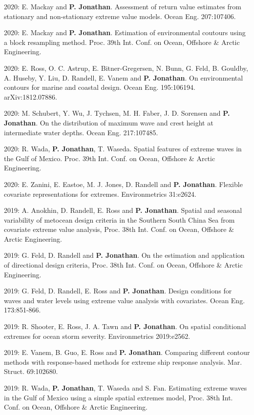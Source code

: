 \documentclass[11pt,a4paper]{moderncv}
\begin{document}
2020: E. Mackay and \textbf{P. Jonathan}. Assessment of return value estimates from stationary and non-stationary extreme value models. Ocean Eng. 207:107406.

2020: E. Mackay and \textbf{P. Jonathan}. Estimation of environmental coutours using a block resampling method. Proc. 39th Int. Conf. on Ocean, Offshore \& Arctic Engineering.

2020: E. Ross, O. C. Astrup, E. Bitner-Gregersen, N. Bunn, G. Feld, B. Gouldby, A. Huseby, Y. Liu,  D. Randell, E. Vanem and \textbf{P. Jonathan}. On environmental contours for marine and coastal design. Ocean Eng. 195:106194. arXiv:1812.07886.

2020: M. Schubert, Y. Wu,  J. Tychsen, M. H. Faber, J. D. Sorensen and \textbf{P. Jonathan}. On the distribution of maximum wave and crest height at intermediate water depths. Ocean Eng. 217:107485.

2020: R. Wada, \textbf{P. Jonathan}, T. Waseda. Spatial features of extreme waves in the Gulf of Mexico. Proc. 39th Int. Conf. on Ocean, Offshore \& Arctic Engineering.

2020: E. Zanini, E. Eastoe, M. J. Jones, D. Randell and \textbf{P. Jonathan}. Flexible covariate representations for extremes. Environmetrics 31:e2624.

2019: A. Anokhin, D. Randell, E. Ross and \textbf{P. Jonathan}. Spatial and seasonal variability of metocean design criteria in the Southern South China Sea from covariate extreme value analysis, Proc. 38th Int. Conf. on Ocean, Offshore \& Arctic Engineering.

2019: G. Feld, D. Randell and \textbf{P. Jonathan}. On the estimation and application of directional design criteria, Proc. 38th Int. Conf. on Ocean, Offshore \& Arctic Engineering. 

2019: G. Feld, D. Randell, E. Ross and \textbf{P. Jonathan}. Design conditions for waves and water levels using extreme value analysis with covariates. Ocean Eng. 173:851-866.

2019: R. Shooter, E. Ross, J. A. Tawn and \textbf{P. Jonathan}. On spatial conditional extremes for ocean storm severity. Environmetrics 2019:e2562.

2019: E. Vanem, B. Guo, E. Ross and \textbf{P. Jonathan}. Comparing different contour methods with response-based methods for extreme ship response analysis. Mar. Struct. 69:102680.

2019: R. Wada, \textbf{P. Jonathan}, T. Waseda and S. Fan. Estimating extreme waves in the Gulf of Mexico using a simple spatial extremes model, Proc. 38th Int. Conf. on Ocean, Offshore \& Arctic Engineering.
\end{document}
